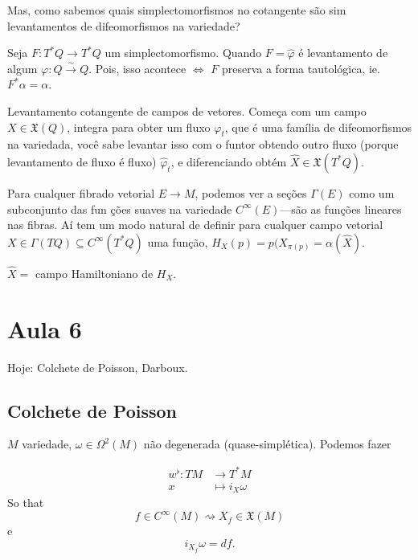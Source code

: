 Mas, como sabemos quais simplectomorfismos no cotangente s\~ao sim levantamentos de difeomorfismos na variedade?

\begin{exercise}
	Seja $F:T^*Q\to T^*Q$ um simplectomorfismo. Quando $F=\hat{\varphi}$ \'e levantamento de algum $\varphi:Q\overset{\sim}{\to } Q $. Pois, isso acontece $\iff$ $F$ preserva a forma tautol\'ogica, ie. $F^*\alpha=\alpha$.
\end{exercise}

\begin{remark}
	Levantamento cotangente de campos de vetores. Come\c ca com um campo $X\in\mathfrak{X}(Q)$, integra para obter um fluxo $\varphi_{t}$, que \'e uma fam\'ilia de difeomorfismos na variedada, voc\^e sabe levantar isso com o funtor obtendo outro fluxo (porque levantamento de fluxo \'e fluxo) $\hat{\varphi}_{t}$, e diferenciando obt\'em $\hat{X}\in\mathfrak{X}(T^*Q)$.
\end{remark}

\begin{remark}
	Para cualquer fibrado vetorial $E \to  M$, podemos ver a se\c c\~oes $\Gamma(E)$ como um subconjunto das fun \c c\~oes suaves na variedade $C^{\infty}(E)$---s\~ao as fun\c c\~oes lineares nas fibras. A\'i tem um modo natural de definir para cualquer campo vetorial $X\in\Gamma(TQ)\subseteq C^{\infty}(T^*Q)$ uma fun\c c\~ao, $H_X(p)=p(X_{\pi(p)}=\alpha(\hat{X})$.
\end{remark}

\begin{prop}
	$\hat{X}=$ campo Hamiltoniano de $H_X$.
\end{prop}

\section{Aula 6}

Hoje: Colchete de Poisson, Darboux.

\subsection{Colchete de Poisson}


$M$ variedade, $\omega\in\Omega^2(M)$ n\~ao degenerada (quase-simpl\'etica). Podemos fazer

\begin{align*}
	w^\flat: TM &\longrightarrow T^*M \\
	x &\longmapsto i_X\omega
\end{align*}
So that
\[f\in C^\infty(M)\rightsquigarrow X_f\in\mathfrak{X}(M)\]
e
\[i_{X_f}\omega=df.\]

